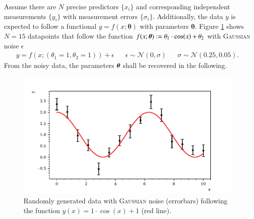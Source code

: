 Assume there are $N$ precise predictors $\{x_i\}$ and corresponding independent measurements $\{y_i\}$ with measurement errors $\{\sigma_i\}$. Additionally, the data $y$ is expected to follow a functional $y=f(x;\boldsymbol{\theta})$ with parameters $\boldsymbol{\theta}$. Figure \ref{fig:data} shows $N=15$ datapoints that follow the function $f(x;\boldsymbol{\theta}):=\theta_1\cdot\cos(x)+\theta_2$ with \textsc{Gaussian} noise $\epsilon$ 
\begin{align}
	y=f(x;(\theta_1=1,\theta_2=1)) +\epsilon	&& \epsilon\sim\mathcal{N}(0,\sigma) && \sigma\sim\mathcal{N}(0.25,0.05).
	\label{eq:data}
\end{align}
From the noisy data, the parameters $\boldsymbol{\theta}$ shall be recovered in the following.
\begin{figure}[htbp]
	\centering
	\includegraphics[width=\linewidth]{../bayes/noisy_model/data.pdf}
	\caption{Randomly generated data with \textsc{Gaussian} noise (errorbars) following the function $y(x)=1\cdot\cos(x)+1$ (red line).}
	\label{fig:data}
\end{figure}
